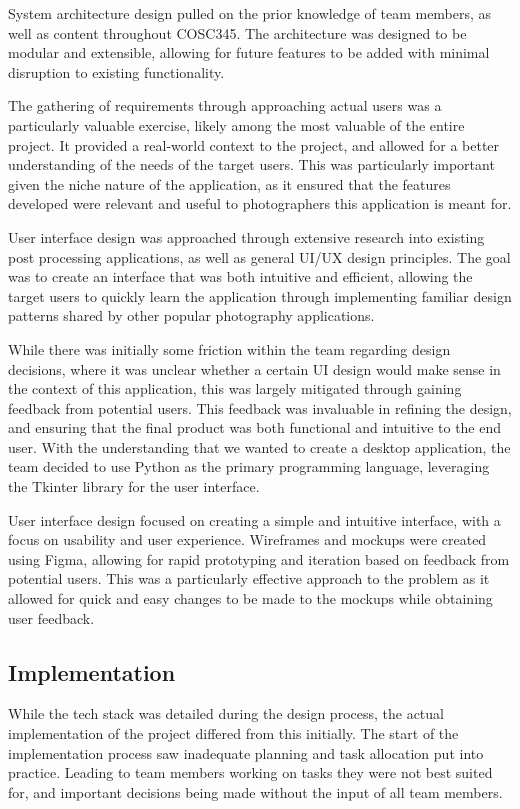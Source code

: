 \documentclass[conference]{IEEEtran}
\begin{document}
System architecture design pulled on the prior knowledge of team members, as well as content throughout COSC345. The architecture was designed to be modular and extensible, allowing for future features to be added with minimal disruption to existing functionality.

The gathering of requirements through approaching actual users was a particularly valuable exercise, likely among the most valuable of the entire project. It provided a real-world context to the project, and allowed for a better understanding of the needs of the target users. This was particularly important given the niche nature of the application, as it ensured that the features developed were relevant and useful to photographers this application is meant for.

User interface design was approached through extensive research into existing post processing applications, as well as general UI/UX design principles. The goal was to create an interface that was both intuitive and efficient, allowing the target users to quickly learn the application through implementing familiar design patterns shared by other popular photography applications.

While there was initially some friction within the team regarding design decisions, where it was unclear whether a certain UI design would make sense in the context of this application, this was largely mitigated through gaining feedback from potential users. This feedback was invaluable in refining the design, and ensuring that the final product was both functional and intuitive to the end user.
With the understanding that we wanted to create a desktop application, the team decided to use Python as the primary programming language, leveraging the Tkinter library for the user interface.

User interface design focused on creating a simple and intuitive interface, with a focus on usability and user experience. Wireframes and mockups were created using Figma, allowing for rapid prototyping and iteration based on feedback from potential users. This was a particularly effective approach to the problem as it allowed for quick and easy changes to be made to the mockups while obtaining user feedback.

\subsection{Implementation}
While the tech stack was detailed during the design process, the actual implementation of the project differed from this initially. The start of the implementation process saw inadequate planning and task allocation put into practice. Leading to team members working on tasks they were not best suited for, and important decisions being made without the input of all team members. 
\end{document}
